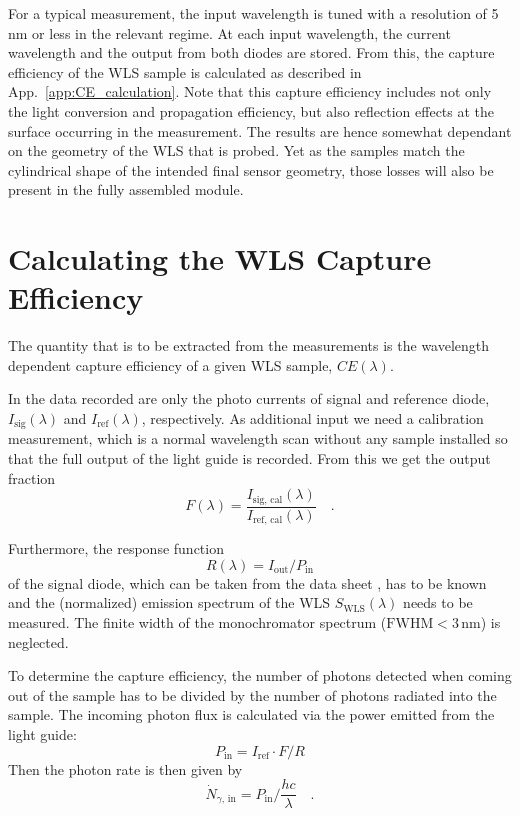 For a typical measurement, the input wavelength is tuned with a resolution of
5\,nm or less in the relevant regime. At each input wavelength, the current
wavelength and the output from both diodes are stored. From this, the capture
efficiency of the WLS sample is calculated as described in
App.~\ref{app:CE_calculation}. Note that this capture efficiency includes
not only the light conversion and propagation efficiency, but also reflection
effects at the surface occurring in the measurement. The results are hence
somewhat dependant on the geometry of the WLS that is probed. Yet as the samples
match the cylindrical shape of the intended final sensor geometry, those losses
will also be present in the fully assembled module.


\section*{\label{app:CE_calculation}\thesection\enskip
Calculating the WLS Capture Efficiency}

The quantity that is to be extracted from the measurements is the wavelength
dependent capture efficiency of a given WLS sample, $CE(\lambda)$.

In the data recorded are only the photo currents of signal and reference diode,
$I_\mathrm{sig}(\lambda)$ and $I_\mathrm{ref}(\lambda)$, respectively. As
additional input we need a calibration measurement, which is a normal
wavelength scan without any sample installed so that the full output of the
light guide is recorded. From this we get the output fraction
\begin{equation}
 F(\lambda) =
\frac{I_\mathrm{sig,\,cal}(\lambda)}{I_\mathrm{ref,\,cal}(\lambda)} \quad .
\end{equation}

Furthermore, the response function
\begin{equation}
 R(\lambda) = I_\mathrm{out}/P_\mathrm{in}
\end{equation}
of the signal diode, which can be taken from the data sheet \cite{PD_datasheet},
has to be known and the (normalized) emission spectrum of the WLS
$S_\mathrm{WLS}(\lambda)$ needs to be measured. The finite width of the
monochromator spectrum ($\mathrm{FWHM} < 3$\,nm) is neglected.

To determine the capture efficiency, the number of photons detected when coming
out of the sample has to be divided by the number of photons radiated into the
sample. The incoming photon flux is calculated via the power emitted from the
light guide:
\begin{equation}
 P_\mathrm{in} = I_\mathrm{ref}\cdot F / R
\end{equation}
Then the photon rate is then given by
\begin{equation}
 \dot{N}_{\gamma,\,\mathrm{in}} = P_\mathrm{in} / {\textstyle
\frac{hc}{\lambda}} \quad .
\end{equation}

